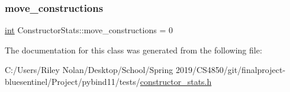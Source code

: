\mbox{\label{class_constructor_stats_a4cb950657607ee9e98510af80fe1de34}} 
\subsubsection{\texorpdfstring{move\_constructions}{move\_constructions}}
{\footnotesize\ttfamily \mbox{\hyperlink{warnings_8h_a74f207b5aa4ba51c3a2ad59b219a423b}{int}} Constructor\+Stats\+::move\+\_\+constructions = 0}



The documentation for this class was generated from the following file\+:\begin{DoxyCompactItemize}
\item 
C\+:/\+Users/\+Riley Nolan/\+Desktop/\+School/\+Spring 2019/\+C\+S4850/git/finalproject-\/bluesentinel/\+Project/pybind11/tests/\mbox{\hyperlink{constructor__stats_8h}{constructor\+\_\+stats.\+h}}\end{DoxyCompactItemize}
